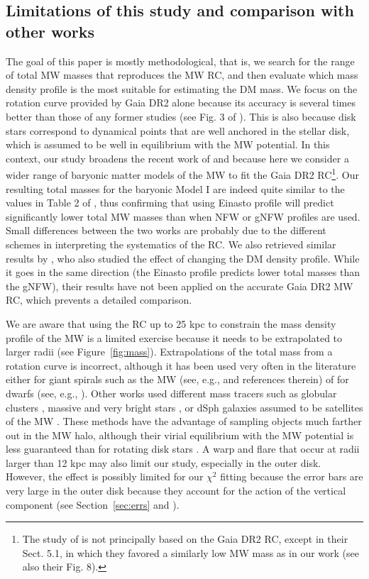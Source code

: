 \documentclass{aa}
\begin{document}
\subsection{Limitations of this study and comparison with other works}
The goal of this paper is mostly methodological, that is, we search for the range of total MW masses that  reproduces the MW RC, and then evaluate which mass density profile is the most suitable for estimating the DM mass. We focus on the rotation curve provided by Gaia DR2 alone \citep{Eilers2019,Mroz2019} because its accuracy is several times better than those of any former studies (see Fig. 3 of \citealt{Eilers2019}). This is also because disk stars correspond to dynamical points that are well anchored in the stellar disk, which is assumed to be well in equilibrium with the MW potential. In this context, our study broadens the recent work of \citet{deSalas2019} and \citet{Karukes2020} because here we consider a wider range of baryonic matter models of the MW to fit the Gaia DR2 RC\footnote{The study of \citet{Karukes2020} is not principally based on the Gaia DR2 RC, except   in their Sect. 5.1, in which they favored a similarly low MW mass as in our work (see also their Fig. 8).}. Our resulting total masses for the baryonic Model I are indeed quite similar to the values in Table 2 of \citet{deSalas2019}, thus confirming that using Einasto profile will predict significantly lower total MW masses than when NFW or gNFW profiles are used. Small differences between the two works are probably due to the different schemes in interpreting the systematics of the \citet{Eilers2019} RC. We also retrieved similar results by \citet{Karukes2020}, who also studied the effect of changing the DM density profile. While it goes in the same direction (the Einasto profile predicts lower total masses than the gNFW), their results have not been applied on the accurate Gaia DR2 MW RC, which prevents a detailed comparison.

We are aware that using the RC up to 25 kpc to constrain the mass density profile of the MW is a limited exercise because it needs to be extrapolated to larger radii (see Figure~\ref{fig:mass}). Extrapolations of the total mass from a rotation curve is incorrect, although it has been used very often in the literature either for giant spirals such as the MW (see, e.g., \citealt{Eilers2019} and references therein) of for dwarfs (see, e.g., \citealt{Read2016}). Other works used different mass tracers such as globular clusters \citep{Vasiliev2019}, massive and very bright stars \citep{Deason2020}, or dSph galaxies assumed to be satellites of the MW \citep{Callingham2019}. These methods have the advantage of sampling objects much farther out in the MW halo, although their virial equilibrium with the MW potential is less guaranteed than for rotating disk stars \citep{Eilers2019}. A warp and flare that occur at radii larger than 12 kpc may also limit our study, especially in the outer disk. However, the effect is possibly limited for our $\chi^2$ fitting because the error bars are very large  in the outer disk because they account for the action of the vertical component (see Section~\ref{sec:errs}  and \citealt{Mackereth2019}).
\end{document}
